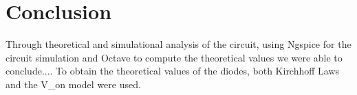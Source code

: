 
\section{Conclusion}
\label{sec:conclusion}


Through theoretical and simulational analysis of the circuit, using Ngspice for the circuit simulation and Octave to compute the theoretical values we were able to conclude....
To obtain the theoretical values of the diodes, both Kirchhoff Laws and the V_on model were used. 
